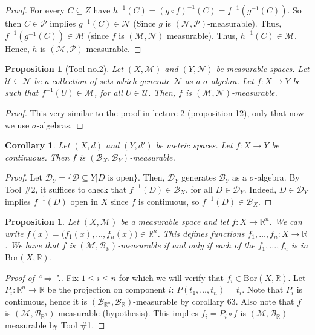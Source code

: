 \documentclass[letterpaper, 12pt]{article}
\newcommand{\cU}{\mathcal{U}}
\newcommand{\cB}{\mathcal{B}}
\newcommand{\cM}{\mathcal{M}}
\newcommand{\cN}{\mathcal{N}}
\newcommand{\cD}{\mathcal{D}}
\newcommand{\bR}{\mathbb{R}}
\newcommand{\cP}{\mathcal{P}}
\theoremstyle{stdthm}
\newtheorem{cor}[thm]{Corollary}
\newtheorem{prop}[thm]{Proposition}
\theoremstyle{stddef}
\theoremstyle{stdnonum}
\theoremstyle{stdqands}
\theoremstyle{stdbold}
\begin{document}
\begin{proof}
For every $C\subseteq Z$ have $h^{-1}(C) = (g \circ f)^{-1} (C) = f^{-1} (g^{-1}(C))$. So then $C \in \cP$ implies $g^{-1}(C) \in \cN$ (Since $g$ is $(\cN,\cP)$-measurable). Thus, $f^{-1}(g^{-1}(C)) \in \cM$ (since $f$ is $(\cM,\cN)$ measurable). Thus, $h^{-1}(C) \in \cM$. Hence, $h$ is $(\cM,\cP)$ measurable. 
\end{proof}

\begin{prop} [Tool no.2]
Let $(X,\cM)$ and $(Y,\cN)$ be measurable spaces. Let $\cU \subseteq \cN$ be a collection of sets which generate $\cN$ as a $\sigma$-algebra. Let $f:X\rightarrow Y$ be such that $f^{-1}(U) \in \cM$, for all $U \in \cU$. Then, $f$ is $(\cM,\cN)$-measurable. 
\end{prop}
\begin{proof}
This very similar to the proof in lecture 2 (proposition 12), only that now we use $\sigma$-algebras. 
\end{proof} 

\begin{cor}
Let $(X,d)$ and $(Y,d')$ be metric spaces. Let $f:X \rightarrow Y$ be continuous. Then $f$ is $(\cB_X,\cB_Y)$-measurable. 
\end{cor}

\begin{proof}
Let $\cD_Y = \{\cD \subseteq Y| D \text{ is open} \}$. Then, $\cD_Y$ generates $\cB_Y$ as a $\sigma$-algebra. By Tool \#2, it suffices to check that $f^{-1}(D) \in \cB_X$, for all $D \in \cD_Y$. Indeed, $D \in \cD_Y$ implies $f^{-1}(D) $ open in $X$ since $f$ is continuous, so $f^{-1}(D) \in \cB_X$. 
\end{proof}

\begin{prop}
Let $(X,\cM)$ be a measurable space and let $f: X \rightarrow \bR^n$. We can write $f(x) = \big(f_1(x),\dots, f_n(x)\big) \in \bR^n$. This defines functions $f_1,\dots, f_n: X \rightarrow \bR$. We have that $f$ is $(\cM,\cB_\bR)$-measurable if and only if each of the $f_1,\dots, f_n$ is in $\mathrm{Bor}(X,\bR)$.
\end{prop}

\begin{proof}[Proof of ``$\Rightarrow$".] Fix $1\leq i \leq n$ for which we will verify that $f_i \in \mathrm{Bor}(X,\bR)$. Let $P_i:\bR^n \rightarrow \bR$ be the projection on component $i$: $P(t_1,\dots,t_n) = t_i$.  Note that $P_i$ is continuous, hence it is $(\cB_{\bR^n},\cB_\bR)$-measurable by corollary 63. Also note that $f$ is $(\cM,\cB_{\bR^n})$-measurable (hypothesis). This implies $f_i = P_i \circ f$ is $(\cM,\cB_\bR)$-measurable by Tool \#1. 
\end{proof}
\end{document}
